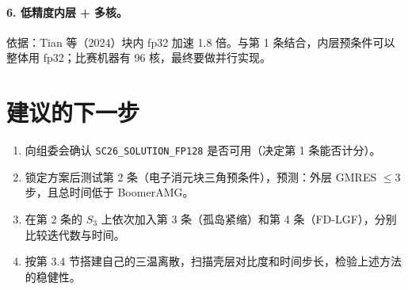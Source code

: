 \documentclass[11pt,a4paper]{ctexart}
\begin{document}
\paragraph{6. 低精度内层 + 多核。}
依据：Tian 等（2024）块内 fp32 加速 1.8 倍。与第 1 条结合，内层预条件可以整体用 fp32；比赛机器有 96 核，最终要做并行实现。

\section{建议的下一步}
\begin{enumerate}
\item 向组委会确认 \texttt{SC26\_\allowbreak SOLUTION\_\allowbreak FP128} 是否可用（决定第 1 条能否计分）。
\item 锁定方案后测试第 2 条（电子消元块三角预条件），预测：外层 GMRES $\le3$ 步，且总时间低于 BoomerAMG。
\item 在第 2 条的 $S_3$ 上依次加入第 3 条（孤岛紧缩）和第 4 条（FD-LGF），分别比较迭代数与时间。
\item 按第 3.4 节搭建自己的三温离散，扫描壳层对比度和时间步长，检验上述方法的稳健性。
\end{enumerate}
\end{document}
